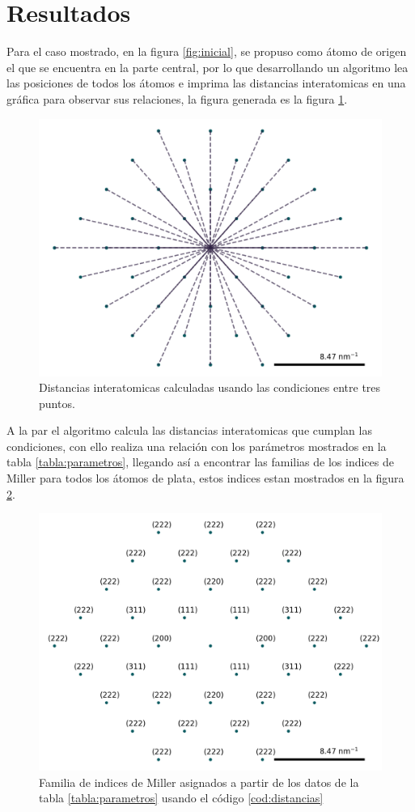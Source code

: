 \documentclass[reprint,amsmath,amssymb,aps,]{revtex4-2}
\begin{document}
\section{Resultados}
Para el caso mostrado, en la figura \ref{fig:inicial}, se propuso como átomo de origen el que se encuentra en la parte central, por lo que
desarrollando un algoritmo lea las posiciones de todos los átomos e imprima las distancias interatomicas en una gráfica para observar sus relaciones,
la figura generada es la figura \ref{fig:distancias}.
\begin{figure}[H]
    \centering
    \includegraphics[scale=0.4]{../Graphics/distancia.png}
    \caption{Distancias interatomicas calculadas usando las condiciones entre tres puntos.}
    \label{fig:distancias}
\end{figure}
A la par el algoritmo calcula las distancias interatomicas que cumplan las condiciones, con ello realiza una relación con los parámetros mostrados en la tabla \ref{tabla:parametros},
llegando así a encontrar las familias de los indices de Miller para todos los átomos de plata, estos indices estan mostrados en la 
figura \ref{fig:indicesmiller}.
\begin{figure}[H]
    \centering
    \includegraphics[scale=0.4]{../Graphics/indices.png}
    \caption{Familia de indices de Miller asignados a partir de los datos de la tabla \ref{tabla:parametros} usando el código \ref{cod:distancias}}
    \label{fig:indicesmiller}
\end{figure}
\end{document}
